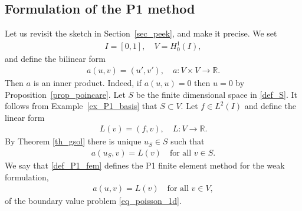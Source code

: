 \documentclass[12pt,oneside]{amsart}
\def\R{\mathbb R}
\begin{document}
\subsection{Formulation of the P1 method}

Let us revisit the sketch in Section~\ref{sec_peek}, and make it precise.
We set 
    \begin{align*}
I = [0,1], \quad V = H_0^1(I),
    \end{align*}
and define the bilinear form
    \begin{align*}
a(u, v) = (u', v'), \quad a : V \times V \to \mathbb R.
    \end{align*}
Then $a$ is an inner product. Indeed,
if $a(u,u) = 0$ then $u=0$ by Proposition~\ref{prop_poincare}.
Let $S$ be the finite dimensional space in \eqref{def_S}.
It follows from Example~\ref{ex_P1_basis} that $S \subset V$.
Let $f \in L^2(I)$ and define the linear form
    \begin{align*}
L(v) = (f, v), \quad L : V \to \R.
    \end{align*}
By Theorem \ref{th_gsol} there is unique $u_S \in S$ such that 
    \begin{align}\label{def_P1_fem}
a(u_S,v) = L(v) \quad \text{for all $v \in S$}.
    \end{align}
We say that \eqref{def_P1_fem} defines the P1 finite element method for the weak formulation,
    \begin{align}\label{def_weak_form}
a(u, v) = L(v) \quad \text{for all $v \in V$},
    \end{align}
of the boundary value problem \eqref{eq_poisson_1d}.
\end{document}
